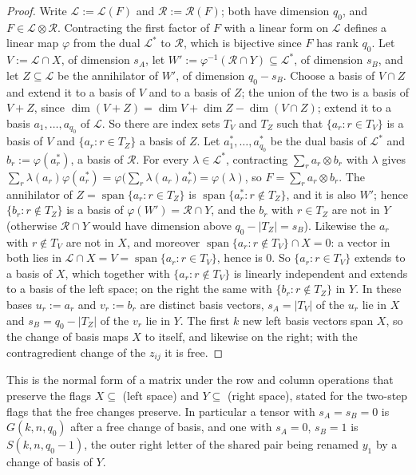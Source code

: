 \documentclass[11pt]{article}
\theoremstyle{definition}
\theoremstyle{remark}
\begin{document}
\begin{proof}
Write $\mathcal{L}:=\mathcal{L}(F)$ and $\mathcal{R}:=\mathcal{R}(F)$; both have dimension $q_0$, and $F\in \mathcal{L}\otimes \mathcal{R}$. Contracting the first factor of $F$ with a linear form on $\mathcal{L}$ defines a linear map $\varphi$ from the dual $\mathcal{L}^*$ to $\mathcal{R}$, which is bijective since $F$ has rank $q_0$. Let $V:=\mathcal{L}\cap X$, of dimension $s_A$, let $W':=\varphi^{-1}(\mathcal{R}\cap Y)\subseteq \mathcal{L}^*$, of dimension $s_B$, and let $Z\subseteq \mathcal{L}$ be the annihilator of $W'$, of dimension $q_0-s_B$. Choose a basis of $V\cap Z$ and extend it to a basis of $V$ and to a basis of $Z$; the union of the two is a basis of $V+Z$, since $\dim(V+Z)=\dim V+\dim Z-\dim(V\cap Z)$; extend it to a basis $a_1,\dots,a_{q_0}$ of $\mathcal{L}$. So there are index sets $T_V$ and $T_Z$ such that $\{a_r:r\in T_V\}$ is a basis of $V$ and $\{a_r:r\in T_Z\}$ a basis of $Z$. Let $a_1^*,\dots,a_{q_0}^*$ be the dual basis of $\mathcal{L}^*$ and $b_r:=\varphi(a_r^*)$, a basis of $\mathcal{R}$. For every $\lambda\in \mathcal{L}^*$, contracting $\sum_ra_r\otimes b_r$ with $\lambda$ gives $\sum_r\lambda(a_r)\varphi(a_r^*)=\varphi\big(\sum_r\lambda(a_r)a_r^*\big)=\varphi(\lambda)$, so $F=\sum_ra_r\otimes b_r$. The annihilator of $Z=\operatorname{span}\{a_r:r\in T_Z\}$ is $\operatorname{span}\{a_r^*:r\notin T_Z\}$, and it is also $W'$; hence $\{b_r:r\notin T_Z\}$ is a basis of $\varphi(W')=\mathcal{R}\cap Y$, and the $b_r$ with $r\in T_Z$ are not in $Y$ (otherwise $\mathcal{R}\cap Y$ would have dimension above $q_0-|T_Z|=s_B$). Likewise the $a_r$ with $r\notin T_V$ are not in $X$, and moreover $\operatorname{span}\{a_r:r\notin T_V\}\cap X=0$: a vector in both lies in $\mathcal{L}\cap X=V=\operatorname{span}\{a_r:r\in T_V\}$, hence is $0$. So $\{a_r:r\in T_V\}$ extends to a basis of $X$, which together with $\{a_r:r\notin T_V\}$ is linearly independent and extends to a basis of the left space; on the right the same with $\{b_r:r\notin T_Z\}$ in $Y$. In these bases $u_r:=a_r$ and $v_r:=b_r$ are distinct basis vectors, $s_A=|T_V|$ of the $u_r$ lie in $X$ and $s_B=q_0-|T_Z|$ of the $v_r$ lie in $Y$. The first $k$ new left basis vectors span $X$, so the change of basis maps $X$ to itself, and likewise on the right; with the contragredient change of the $z_{ij}$ it is free.
\end{proof}

This is the normal form of a matrix under the row and column operations that preserve the flags $X\subseteq$ (left space) and $Y\subseteq$ (right space), stated for the two-step flags that the free changes preserve. In particular a tensor with $s_A=s_B=0$ is $G(k,n,q_0)$ after a free change of basis, and one with $s_A=0$, $s_B=1$ is $S(k,n,q_0-1)$, the outer right letter of the shared pair being renamed $y_1$ by a change of basis of $Y$.
\end{document}
